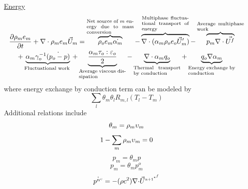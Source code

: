 \documentclass[fleqn]{article}
\begin{document}
\underline{\textsf{Energy}}
\begin{multline}
    \label{eq:cont_energy}
    \pd{ \rho_m e_m }{t} + \nabla \cdot \rho_m e_m \um = 
    \overbrace{     \rhoo e_m \dot{\alpham} }^{\pboxsmall{Net source of $m$ energy due to mass conversion} }
-   \overbrace{   \nabla \cdot (\alpham \rhoo e_o \um^\prime) }^{\pboxsmall{Multiphase fluctuational transport of energy} }
-   \overbrace{    p_m \nabla \cdot \vec{U^f} }^{\pboxsmall{Average multiphase work} } \\
+   \underbrace{  \alpham \gamma^{-1}_o \dot{(p_o - p)} }_{\pboxsmall{Fluctuational work} }
+   \underbrace{  \frac{  \alpham \tau_o:\varepsilon_o  }{2} }_{\pboxsmall{Average viscous dissipation} } 
-   \underbrace{  \nabla \cdot \alpham q_o }_{\pboxsmall{Thermal transport by conduction} }
+   \underbrace{  q_o\nabla \alpham  }_{\pboxsmall{Energy exchange by conduction} } 
\end{multline}
%
where energy exchange by conduction term can be modeled by
%
\begin{equation}
    \sum_{l} \theta_m \theta_l R_{m,l}(T_l - T_m)
\end{equation}
%
Additional relations include\\
%
\[\theta_m = \rhom \upsilon_m\]
\[  1 - \sum_m \rhom \upsilon_m = 0\]
\[p_m = \theta_m p \]
\[p_m = \theta_m p^o_m \]
\begin{equation}
    \label{eq:press_eq}
    \dot{\pnc} =
    -( \rho c^2 ) \nabla{\cdot \ustar}
\end{equation}
\\  
\end{document}
